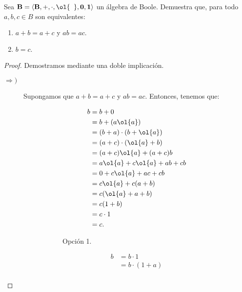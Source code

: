 \begin{ejercicio}
    Sea $\bf{B}=\langle B,+,\cdot,\ol{\phantom{a}}, 0,1\rangle$ un álgebra de Boole. Demuestra que,
    para todo $a,b,c\in B$ son equivalentes:
    \begin{enumerate}
        \item $a+b=a+c$ y $ab=ac$.
        \item $b=c$.
    \end{enumerate}
    \begin{proof}
        Demostramos mediante una doble implicación.
        \begin{description}
            \item[$\Longrightarrow)$]
            
            Supongamos que $a+b=a+c$ y $ab=ac$. Entonces, tenemos que:
            \begin{figure}[H]
                \centering
                \begin{subfigure}[c]{0.4\linewidth}
                    \centering
                    \begin{align*}
                        b &= b + 0\\
                        &= b + (a\ol{a})\\
                        &= (b+a) \cdot (b+\ol{a})\\
                        &= (a+c) \cdot (\ol{a}+b)\\
                        &= (a+c)\ol{a} + (a+c)b\\
                        &= a\ol{a} + c\ol{a} + ab + cb\\
                        &= 0 + c\ol{a} + ac + cb\\
                        &= c\ol{a} + c(a+b)\\
                        &= c(\ol{a} + a + b)\\
                        &= c(1+b)\\
                        &= c\cdot 1\\
                        &= c.
                    \end{align*}
                    \caption{Opción 1.}
                \end{subfigure}\hfill
                \begin{subfigure}[c]{0.4\linewidth}
                    \centering
                    \begin{align*}
                        b &= b\cdot 1\\
                        &= b\cdot (1+a) \\

\end{align*}
\end{subfigure}
\end{figure}
\end{description}
\end{proof}
\end{ejercicio}
